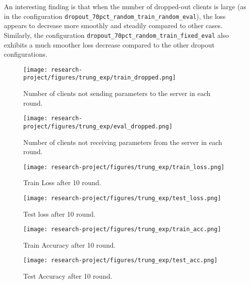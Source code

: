 \documentclass[12pt, a4paper]{article}
\begin{document}
An interesting finding is that when the number of dropped-out clients is large (as in the configuration \texttt{dropout\_70pct\_random\_train\_random\_eval}), the loss appears to decrease more smoothly and steadily compared to other cases. Similarly, the configuration \texttt{dropout\_70pct\_random\_train\_fixed\_eval} also exhibits a much smoother loss decrease compared to the other dropout configurations.



\begin{figure}[H]
    \centering
    \begin{minipage}[b]{0.48\textwidth}
        \centering
        \texttt{[image: research-project/figures/trung\_exp/train\_dropped.png]}
        \caption{Number of clients not sending parameters to the server in each round.}
        \label{fig:train_dropped}
    \end{minipage}
    \hfill
    \begin{minipage}[b]{0.48\textwidth}
        \centering
        \texttt{[image: research-project/figures/trung\_exp/eval\_dropped.png]}
        \caption{Number of clients not receiving parameters from the server in each round.}
        \label{fig:eval_dropped}
    \end{minipage}
\end{figure}



\begin{figure}[H]
    \centering
    \begin{minipage}[b]{0.48\textwidth}
        \centering
        \texttt{[image: research-project/figures/trung\_exp/train\_loss.png]}
        \caption{Train Loss after 10 round.}
        \label{fig:train_loss}
    \end{minipage}
    \hfill
    \begin{minipage}[b]{0.48\textwidth}
        \centering
        \texttt{[image: research-project/figures/trung\_exp/test\_loss.png]}
        \caption{Test loss after 10 round.}
        \label{fig:test_loss}
    \end{minipage}
\end{figure}


\begin{figure}[H]
    \centering
    \begin{minipage}[b]{0.48\textwidth}
        \centering
        \texttt{[image: research-project/figures/trung\_exp/train\_acc.png]}
        \caption{Train Accuracy after 10 round.}
        \label{fig:train_acc}
    \end{minipage}
    \hfill
    \begin{minipage}[b]{0.48\textwidth}
        \centering
        \texttt{[image: research-project/figures/trung\_exp/test\_acc.png]}
        \caption{Test Accuracy after 10 round.}
        \label{fig:test_acc}
    \end{minipage}
\end{figure}
\end{document}
